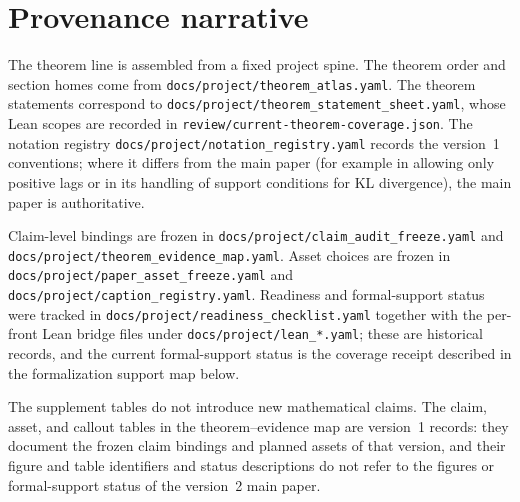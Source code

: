 \section{Provenance narrative}
The theorem line is assembled from a fixed project spine.
The theorem order and section homes come from \texttt{docs/project/theorem\_atlas.yaml}.
The theorem statements correspond to \texttt{docs/project/theorem\_statement\_sheet.yaml}, whose Lean scopes are recorded in \texttt{review/current-theorem-coverage.json}.
The notation registry \texttt{docs/project/notation\_registry.yaml} records the version~1 conventions; where it differs from the main paper (for example in allowing only positive lags or in its handling of support conditions for KL divergence), the main paper is authoritative.

Claim-level bindings are frozen in \texttt{docs/project/claim\_audit\_freeze.yaml} and \texttt{docs/project/theorem\_evidence\_map.yaml}.
Asset choices are frozen in \texttt{docs/project/paper\_asset\_freeze.yaml} and \texttt{docs/project/caption\_registry.yaml}.
Readiness and formal-support status were tracked in \texttt{docs/project/readiness\_checklist.yaml} together with the per-front Lean bridge files under \texttt{docs/project/lean\_*.yaml}; these are historical records, and the current formal-support status is the coverage receipt described in the formalization support map below.

The supplement tables do not introduce new mathematical claims.
The claim, asset, and callout tables in the theorem--evidence map are version~1 records: they document the frozen claim bindings and planned assets of that version, and their figure and table identifiers and status descriptions do not refer to the figures or formal-support status of the version~2 main paper.
